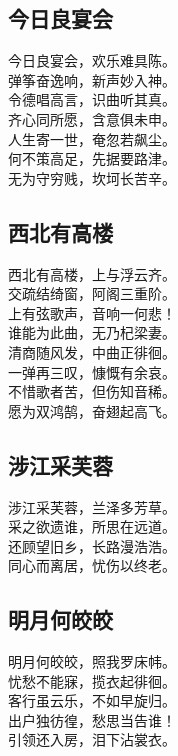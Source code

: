 \documentclass[]{article}
\begin{document}
\hypertarget{header-n18}{%
\subsection{今日良宴会}\label{header-n18}}

今日良宴会，欢乐难具陈。\\
弹筝奋逸响，新声妙入神。\\
令德唱高言，识曲听其真。\\
齐心同所愿，含意俱未申。\\
人生寄一世，奄忽若飙尘。\\
何不策高足，先据要路津。\\
无为守穷贱，坎坷长苦辛。

\hypertarget{header-n22}{%
\subsection{西北有高楼}\label{header-n22}}

西北有高楼，上与浮云齐。\\
交疏结绮窗，阿阁三重阶。\\
上有弦歌声，音响一何悲！\\
谁能为此曲，无乃杞梁妻。\\
清商随风发，中曲正徘徊。\\
一弹再三叹，慷慨有余哀。\\
不惜歌者苦，但伤知音稀。\\
愿为双鸿鹄，奋翅起高飞。

\hypertarget{header-n26}{%
\subsection{涉江采芙蓉}\label{header-n26}}

涉江采芙蓉，兰泽多芳草。\\
采之欲遗谁，所思在远道。\\
还顾望旧乡，长路漫浩浩。\\
同心而离居，忧伤以终老。

\hypertarget{header-n30}{%
\subsection{明月何皎皎}\label{header-n30}}

明月何皎皎，照我罗床帏。\\
忧愁不能寐，揽衣起徘徊。\\
客行虽云乐，不如早旋归。\\
出户独彷徨，愁思当告谁！\\
引领还入房，泪下沾裳衣。
\end{document}
